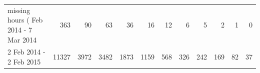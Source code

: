 \begin{tabular}{lrrrrrrrrrrr}
\toprule
missing hours (%
\midrule
8 Feb 2014 - 7 Mar 2014  & 363 & 90 & 63 & 36 & 16 & 12 & 6 & 5 & 2 & 1 & 0 \\
2 Feb 2014 - 2 Feb 2015 & 11327 & 3972 & 3482 & 1873 & 1159 & 568 & 326 & 242 & 169 & 82 & 37 \\
\bottomrule
\end{tabular}
